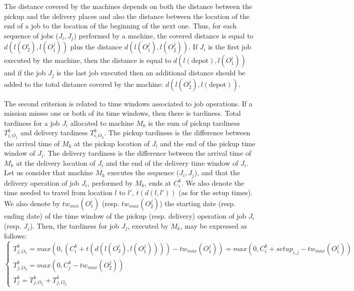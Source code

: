 \documentclass[a4paper,10pt]{article}
\begin{document}
The distance covered by the machines depends on both the distance between the pickup and the delivery places and also the distance between the location of the end of a job to the location of the beginning of the next one. Thus, for each sequence of jobs ($J_i,J_j$) performed by a machine, the covered distance is equal to $d(l(O^i_2), l(O^j_1))$ plus the distance $d(l(O^j_1), l(O^j_2))$. If $J_i$ is the first job executed by the machine, then the distance is equal to $d(l(\mbox{depot}),l(O^i_1))$ and if the job $J_j$ is the last job executed then an additional distance should be added to the total distance covered by the machine: $d(l(O^j_2),l(\mbox{depot}))$.

The second criterion is related to time windows associated to job operations. If a mission misses one or both of its time windows, then there is tardiness. Total tardiness for a job $J_i$ allocated to machine $M_k$ is the sum of pickup tardiness $T^k_{i,O_1}$ and delivery tardiness $T^k_{i,O_2}$. The pickup tardiness is the difference between the arrival time of $M_k$ at the pickup location of $J_i$ and the end of the pickup time window of $J_i$. The delivery tardiness is the difference between the arrival time of $M_k$ at the delivery location of $J_i$ and the end of the delivery time window of $J_i$. \\

Let us consider that machine $M_k$ executes the sequence ($J_i,J_j$), and that the delivery operation of job $J_i$, performed by $M_k$, ends at $C^k_i$. We also denote the time needed to travel from location $l$ to $l'$, $t(d(l,l'))$ (as for the setup times). We also denote by $tw_{min}(O^i_1)$ (resp. $tw_{max}(O^j_2)$) the starting date (resp. ending date) of the time window of the pickup (resp. delivery) operation of job $J_i$ (resp. $J_j$). Then, the tardiness for job $J_j$, executed by $M_k$, may be expressed as follows: 
\begin{equation*}
 \begin{cases}
    T^k_{j,O_1} = max(0, (C^k_i + t(d(l(O^i_2),l(O^j_1)))) - tw_{max}(O^j_1)) = max(0,C^k_i+setup_{i,j}-tw_{max}(O^j_1))\\
    T^k_{j,O_2} = max(0 ,C^k_j - tw_{max}(O^j_2))\\
    T^k_{j} = T^k_{j,O_1} + T^k_{j,O_2}
\end{cases}
\end{equation*}
\end{document}
